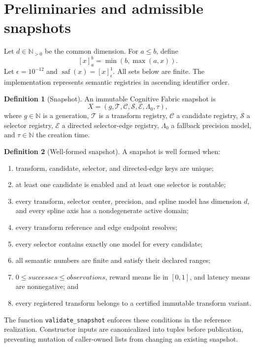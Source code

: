 \documentclass[11pt]{article}
\theoremstyle{definition}
\newtheorem{definition}{Definition}[section]
\theoremstyle{plain}
\newcommand{\N}{\mathbb{N}}
\newcommand{\clip}[3]{\left[#1\right]_{#2}^{#3}}
\begin{document}
\section{Preliminaries and admissible snapshots}

Let $d\in\N_{>0}$ be the common dimension.  For $a\le b$, define
\[
  \clip{x}{a}{b}=\min(b,\max(a,x)).
\]
Let $\epsilon=10^{-12}$ and
$\operatorname{saf}(x)=\clip{x}{\epsilon}{1}$.  All sets below are finite.
The implementation represents semantic registries in ascending identifier
order.

\begin{definition}[Snapshot]
An immutable Cognitive Fabric snapshot is
\[
  X=(g,\mathcal T,\mathcal C,\mathcal S,\mathcal E,\Lambda_0,\tau),
\]
where $g\in\N$ is a generation, $\mathcal T$ is a transform registry,
$\mathcal C$ a candidate registry, $\mathcal S$ a selector registry,
$\mathcal E$ a directed selector-edge registry, $\Lambda_0$ a fallback
precision model, and $\tau\in\N$ the creation time.
\end{definition}

\begin{definition}[Well-formed snapshot]
A snapshot is well formed when:
\begin{enumerate}[leftmargin=*,itemsep=1pt]
  \item transform, candidate, selector, and directed-edge keys are unique;
  \item at least one candidate is enabled and at least one selector is
  routable;
  \item every transform, selector center, precision, and spline model has
  dimension $d$, and every spline axis has a nondegenerate active domain;
  \item every transform reference and edge endpoint resolves;
  \item every selector contains exactly one model for every candidate;
  \item all semantic numbers are finite and satisfy their declared ranges;
  \item $0\le successes\le observations$, reward means lie in $[0,1]$, and
  latency means are nonnegative; and
  \item every registered transform belongs to a certified immutable transform
  variant.
\end{enumerate}
\end{definition}

The function \texttt{validate\_snapshot} enforces these conditions in the
reference realization.  Constructor inputs are canonicalized into tuples
before publication, preventing mutation of caller-owned lists from changing
an existing snapshot.
\end{document}
